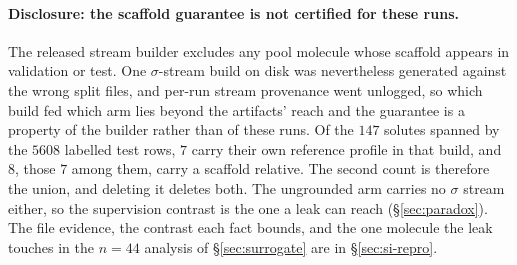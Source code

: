 \paragraph{Disclosure: the scaffold guarantee is not certified for these runs.}
The released stream builder excludes any pool molecule whose scaffold appears in validation or test.
One $\sigma$-stream build on disk was nevertheless generated against the wrong split files, and
per-run stream provenance went unlogged, so which build fed which arm lies beyond the artifacts'
reach and the guarantee is a property of the builder rather than of these runs. Of the $147$ solutes
spanned by the $5608$ labelled test rows, $7$ carry their own reference profile in that build, and
$8$, those $7$ among them, carry a scaffold relative. The second count is therefore the union, and deleting
it deletes both. The ungrounded arm carries no $\sigma$ stream either, so the supervision contrast
is the one a leak can reach (\S\ref{sec:paradox}). The file evidence, the contrast each fact bounds, and the one molecule the leak
touches in the $n{=}44$ analysis of \S\ref{sec:surrogate} are in \S\ref{sec:si-repro}.

